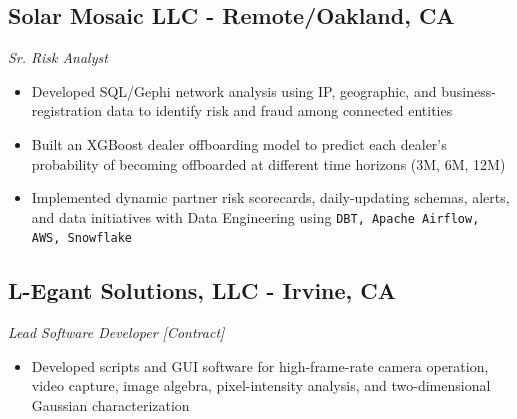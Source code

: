 \documentclass[11pt,a4paper]{article}
\newenvironment{myitemize}
{ \begin{itemize}[label={--}, leftmargin=*]
		\setlength{\itemsep}{0pt}
		\setlength{\parskip}{0pt}
		\setlength{\parsep}{0pt}     }
	{ \end{itemize}                  }
\begin{document}
	\subsection*{Solar Mosaic LLC - Remote/Oakland, CA \hfill
	\vspace{-1mm}
	 }
\vspace{-1.5mm}
\textit{Sr. Risk Analyst}
\vspace{-2.5mm}
\begin{myitemize}
	\item Developed SQL/Gephi network analysis using IP, geographic, and business-registration data to identify risk and fraud among connected entities
\item Built an XGBoost dealer offboarding model to predict each dealer's probability of becoming offboarded at different time horizons (3M, 6M, 12M)
	\item Implemented dynamic partner risk scorecards, daily-updating schemas, alerts, and data initiatives with Data Engineering using \texttt{DBT, Apache Airflow, AWS, Snowflake}
\end{myitemize}
		\vspace{-7mm} %
	\subsection*{L-Egant Solutions, LLC - Irvine, CA \hfill
					\vspace{-1mm} %
		  }
	\vspace{-1.5mm} %
	\textit{Lead Software Developer [Contract]}
	\vspace{-2.5mm} %
\begin{myitemize}
	\item Developed scripts and GUI software for high-frame-rate camera operation, video capture, image algebra, pixel-intensity analysis, and two-dimensional Gaussian characterization
\end{myitemize}
		\vspace{-7mm} %
\end{document}
